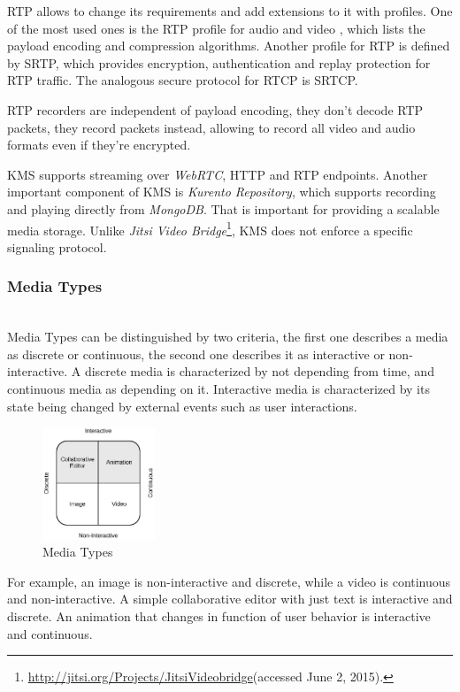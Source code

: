 \documentclass[conference,compsoc,a4paper]{IEEEtran}
\begin{document}
  \gls{RTP} allows to change its requirements and add extensions to it with profiles. One of the most used ones is the \gls{RTP} profile for audio and video \cite{rfc3551}, which lists the payload encoding and compression algorithms. 
  Another profile for \gls{RTP} is defined by \gls{SRTP}, which provides encryption, authentication and replay protection for \gls {RTP} traffic. The analogous secure protocol for \gls{RTCP} is \gls{SRTCP}.

  \gls{RTP} recorders are independent of payload encoding, they don't decode \gls{RTP} packets, they record packets instead, allowing to record all video and audio formats even if they're encrypted.
 
	\gls{KMS} supports streaming over \emph{WebRTC}, \gls{HTTP} and \gls{RTP} endpoints. Another important component of \gls{KMS} is \emph{Kurento Repository}, which supports recording and playing directly from \emph{MongoDB}. That is important for providing a scalable media storage. Unlike \emph{Jitsi Video Bridge}\footnote{\url{http://jitsi.org/Projects/JitsiVideobridge}(accessed June 2, 2015).}, \gls{KMS} does not enforce a specific signaling protocol.
	

\subsubsection{Media Types}\label{mediatype}~\\
	Media Types can be distinguished by two criteria, the first one describes a media as discrete or continuous, the second one describes it as interactive or non-interactive. A discrete media is characterized by not depending from time, and continuous media as depending on it. Interactive media is characterized by its state being changed by external events such as user interactions.
  
  
\begin{figure}
	\centering
	\includegraphics[width=0.3\textwidth]{figures/media_types.png}
	\caption{Media Types}
\end{figure}
	For example, an image is non-interactive and discrete, while a video is continuous and non-interactive. A simple collaborative editor with just text is interactive and discrete. An animation that changes in function of user behavior is interactive and continuous.
\end{document}
